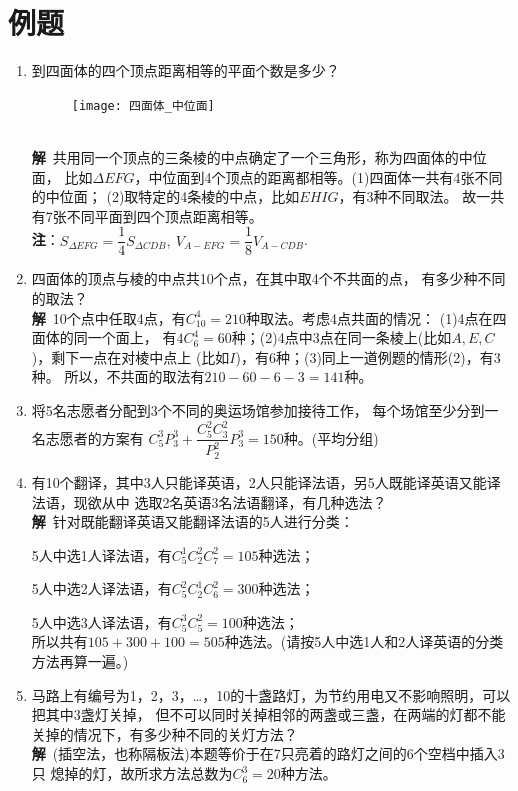 \section{例题}
\begin{enumerate}[label={【\textbf{例\thechapter.\arabic*}】},
 leftmargin=\inteval{\myenumleftmargin}pt,
 itemsep=\inteval{\myenumitempsep}pt,
 itemindent=\inteval{\myenumitemindent}pt]
\item 到四面体的四个顶点距离相等的平面个数是多少？ 
\begin{figure}[h]
    \centering
    \texttt{[image: 四面体\_中位面]}
\end{figure} \\
\textbf{解}\ 共用同一个顶点的三条棱的中点确定了一个三角形，称为四面体的中位面，
比如$ \Delta EFG $，中位面到4个顶点的距离都相等。(1)四面体一共有4张不同的中位面；
(2)取特定的4条棱的中点，比如$ EHIG $，有3种不同取法。
故一共有7张不同平面到四个顶点距离相等。\\
\textbf{注}：$ S_{\Delta EFG}=\dfrac{1}{4}S_{\Delta CDB},\ 
V_{A-EFG}=\dfrac{1}{8}V_{A-CDB} $. 

\item 四面体的顶点与棱的中点共10个点，在其中取4个不共面的点，
有多少种不同的取法？\\
\textbf{解}\ 10个点中任取4点，有$ C_{10}^4=210 $种取法。考虑4点共面的情况：
(1)4点在四面体的同一个面上，
有$ 4C_6^4=60 $种；(2)4点中3点在同一条棱上(比如$ A,E,C $)，剩下一点在对棱中点上
(比如$ I $)，有6种；(3)同上一道例题的情形(2)，有3种。
所以，不共面的取法有$ 210-60-6-3=141 $种。

\item 将5名志愿者分配到3个不同的奥运场馆参加接待工作，
每个场馆至少分到一名志愿者的方案有 $ 
C_5^3P_3^3+\dfrac{C_5^2C_3^2}{P_2^2}P_3^3=150 $种。(平均分组)

\item 有10个翻译，其中3人只能译英语，2人只能译法语，另5人既能译英语又能译法语，现欲从中
选取2名英语3名法语翻译，有几种选法？\\
\textbf{解}\ 针对既能翻译英语又能翻译法语的5人进行分类：

5人中选1人译法语，有$ C_5^1C_2^2C_7^2 = 105 $种选法；

5人中选2人译法语，有$ C_5^2C_2^1C_6^2 = 300 $种选法；

5人中选3人译法语，有$ C_5^3C_5^2= 100 $种选法； \\
所以共有$ 105 + 300 + 100 = 505 $种选法。(请按5人中选1人和2人译英语的分类方法再算一遍。)

\item 马路上有编号为1，2，3，…，10的十盏路灯，为节约用电又不影响照明，可以把其中3盏灯关掉，
但不可以同时关掉相邻的两盏或三盏，在两端的灯都不能关掉的情况下，有多少种不同的关灯方法？\\
\textbf{解}\ (插空法，也称隔板法)本题等价于在7只亮着的路灯之间的6个空档中插入3只
熄掉的灯，故所求方法总数为$  C_6^3= 20 $种方法。


\end{enumerate}
